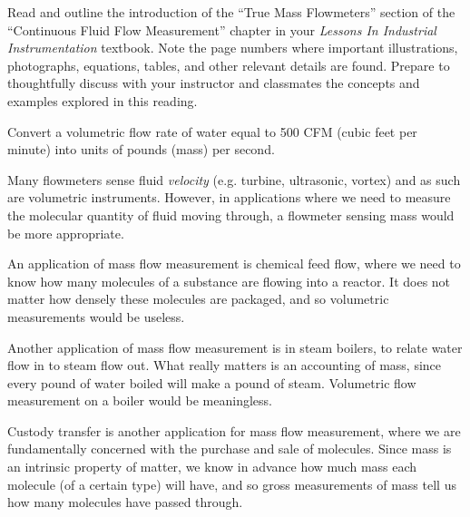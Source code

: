 

Read and outline the introduction of the ``True Mass Flowmeters'' section of the ``Continuous Fluid Flow Measurement'' chapter in your {\it Lessons In Industrial Instrumentation} textbook.  Note the page numbers where important illustrations, photographs, equations, tables, and other relevant details are found.  Prepare to thoughtfully discuss with your instructor and classmates the concepts and examples explored in this reading.

\vskip 10pt

Convert a volumetric flow rate of water equal to 500 CFM (cubic feet per minute) into units of pounds (mass) per second.














Many flowmeters sense fluid {\it velocity} (e.g. turbine, ultrasonic, vortex) and as such are volumetric instruments.  However, in applications where we need to measure the molecular quantity of fluid moving through, a flowmeter sensing mass would be more appropriate.

\vskip 10pt

An application of mass flow measurement is chemical feed flow, where we need to know how many molecules of a substance are flowing into a reactor.  It does not matter how densely these molecules are packaged, and so volumetric measurements would be useless.

Another application of mass flow measurement is in steam boilers, to relate water flow in to steam flow out.  What really matters is an accounting of mass, since every pound of water boiled will make a pound of steam.  Volumetric flow measurement on a boiler would be meaningless.

Custody transfer is another application for mass flow measurement, where we are fundamentally concerned with the purchase and sale of molecules.  Since mass is an intrinsic property of matter, we know in advance how much mass each molecule (of a certain type) will have, and so gross measurements of mass tell us how many molecules have passed through.


